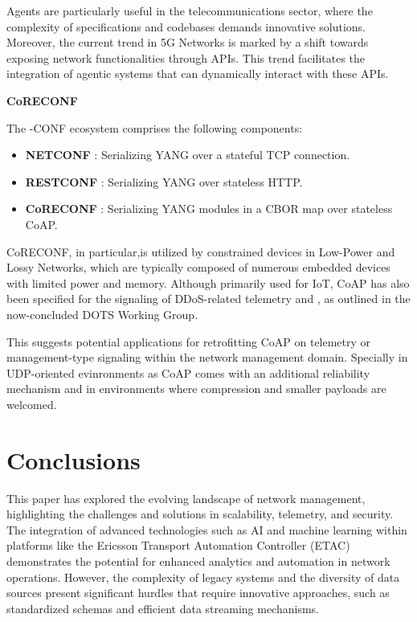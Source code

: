 \documentclass[11pt,sigconf]{iabart}
\begin{document}
Agents are particularly useful in the telecommunications sector, where the complexity of specifications and codebases demands innovative solutions. Moreover, the current trend in 5G Networks is marked by a shift towards exposing network functionalities through APIs. This trend facilitates the integration of agentic systems that can dynamically interact with these APIs.

\textbf{CoRECONF}

The -CONF ecosystem comprises the following components:
\begin{itemize}
  \item \textbf{NETCONF} \cite{RFC6241}: Serializing YANG over a stateful TCP connection.    
  \item \textbf{RESTCONF} \cite{RFC8040}: Serializing YANG over stateless HTTP.
  \item \textbf{CoRECONF} \cite{draft-ietf-core-comi}: Serializing YANG modules in a CBOR \cite{RFC9254} map over stateless CoAP.
\end{itemize}

CoRECONF, in particular,is utilized by constrained devices in Low-Power and Lossy Networks, which are typically composed of numerous embedded devices with limited power and memory. Although primarily used for IoT, CoAP has also been specified for the signaling of DDoS-related telemetry \cite{RFC9132} and \cite{RFC9362}, as outlined in the now-concluded DOTS Working Group. 

This suggests potential applications for retrofitting CoAP on telemetry or management-type signaling within the network management domain. Specially in UDP-oriented evinronments as CoAP comes with an additional reliability mechanism and in environments where compression and smaller payloads are welcomed. 

\section{Conclusions} \label{conclusions}

This paper has explored the evolving landscape of network management, highlighting the challenges and solutions in scalability, telemetry, and security. The integration of advanced technologies such as AI and machine learning within platforms like the Ericsson Transport Automation Controller (ETAC) demonstrates the potential for enhanced analytics and automation in network operations. However, the complexity of legacy systems and the diversity of data sources present significant hurdles that require innovative approaches, such as standardized schemas and efficient data streaming mechanisms.
\end{document}
